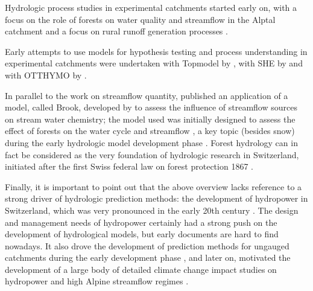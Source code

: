 \documentclass[10pt,a4paper]{article}
\begin{document}
Hydrologic process studies in experimental catchments started early on, with a focus on the role of forests on water quality and streamflow in the Alptal catchment \citep{keller1970, keller1989} and a focus on rural runoff generation processes \citep{jaton1982}.

Early attempts to use models for hypothesis testing and process understanding in experimental catchments \citep{jordan1990} were  undertaken with Topmodel by \citet{Iorgulescu1994}, with SHE by \citet{jordan1987} and with OTTHYMO by \citet{wisner1983}.

In parallel to the work on streamflow quantity, \citet{keller1991} published an application of a model, called Brook, developed by \citet{federer1978} to assess the influence of streamflow sources on stream water chemistry; the model used was initially designed to assess the effect of forests on the water cycle and streamflow \citep{foster1989}, a key topic (besides snow) during the early hydrologic model development phase \citep{keller1979, hegg2006}. Forest hydrology can in fact be considered as the very foundation of hydrologic research in Switzerland, initiated after the first Swiss federal law on forest protection 1867 \citep{keller1985, hegg2006}.

Finally, it is important to point out that the above overview lacks reference to a strong  driver of hydrologic prediction methods: the development of hydropower in Switzerland, which was very pronounced in the early 20th century \citep{jeger1942}. The design and management needs of hydropower certainly had a strong push on the development of hydrological models, but early documents are hard to find nowadays. It also drove the development of prediction methods for ungauged catchments during the early development phase \citep{bruschin1977}, and later on, motivated the development of a large body of detailed climate change impact studies on hydropower and high Alpine streamflow regimes \citep{westaway2000,schaefli2015}. 



\clearpage
\end{document}
